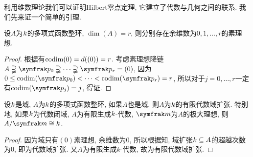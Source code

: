 利用维数理论我们可以证明Hilbert零点定理, 它建立了代数与几何之间的联系. 我们先来证一个简单的引理.

\begin{proposition}\label{prop:ringdimprimeidealexist}
  设$A$为$k$的多项式函数整环, $\dim (A)=r$, 则分别存在余维数为$0, 1, \dotsc, r$的素理想.
\end{proposition}

\begin{proof}
  根据有$\operatorname{codim} (0)=d((0))=r$. 考虑素理想降链$A\supsetneqq \ideal{p}_0\supsetneqq \dotsb\supsetneqq \ideal{p}_r=(0)$, 因为$0\leq \codim (\ideal{p}_0)< \dotsb <\codim (\ideal{p}_r)=r$, 所以对于$j=0, \dotsc, r$一定有$\codim (\ideal{p}_j)=j$, 得证.
\end{proof}

\begin{theorem}\label{thm:hilbert-nullstellensatz-weak}
  设$k$是域, $A$为$k$的多项式函数整环, 如果$A$也是域, 则$A$为$k$的有限代数域扩张. 特别地, 如果$k$为代数闭域, $A$为有限生成$k$-代数, $\ideal{m}$为$A$的极大理想, 则$A/\ideal{m}\cong \field{k}$.
\end{theorem}

\begin{proof}
  因为域只有$(0)$素理想, 余维数为0, 所以根据知, 域扩张$k\subseteq A$的超越次数为0, 即为代数域扩张. 又$A$为有限生成$k$-代数, 故为有限代数域扩张.
\end{proof}






